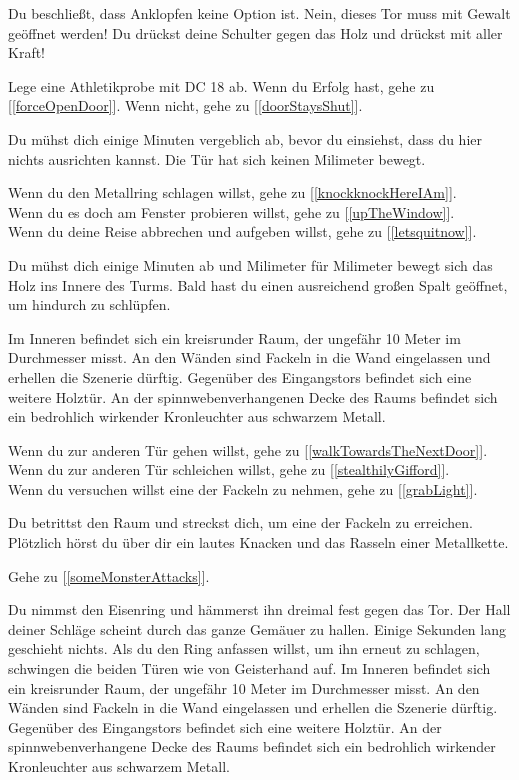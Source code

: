 
Du beschließt, dass Anklopfen keine Option ist. Nein, dieses Tor muss mit Gewalt geöffnet werden! Du drückst deine Schulter gegen das Holz und drückst mit aller Kraft!

Lege eine Athletikprobe mit DC 18 ab. Wenn du Erfolg hast, gehe zu [\ref{forceOpenDoor}].
Wenn nicht, gehe zu [\ref{doorStaysShut}].


Du mühst dich einige Minuten vergeblich ab, bevor du einsiehst, dass du hier nichts ausrichten kannst. Die Tür hat sich keinen Milimeter bewegt.

Wenn du den Metallring schlagen willst, gehe zu [\ref{knockknockHereIAm}].
\\Wenn du es doch am Fenster probieren willst, gehe zu [\ref{upTheWindow}].
\\Wenn du deine Reise abbrechen und aufgeben willst, gehe zu [\ref{letsquitnow}].


Du mühst dich einige Minuten ab und Milimeter für Milimeter bewegt sich das Holz ins Innere des Turms. Bald hast du einen ausreichend großen Spalt geöffnet, um hindurch zu schlüpfen.

Im Inneren befindet sich ein kreisrunder Raum, der ungefähr 10 Meter im Durchmesser misst. An den Wänden sind Fackeln in die Wand eingelassen und erhellen die Szenerie dürftig. Gegenüber des Eingangstors befindet sich eine weitere Holztür. An der spinnwebenverhangenen Decke des Raums befindet sich ein bedrohlich wirkender Kronleuchter aus schwarzem Metall.

Wenn du zur anderen Tür gehen willst, gehe zu [\ref{walkTowardsTheNextDoor}].
\\Wenn du zur anderen Tür schleichen willst, gehe zu [\ref{stealthilyGifford}].
\\Wenn du versuchen willst eine der Fackeln zu nehmen, gehe zu [\ref{grabLight}].


Du betrittst den Raum und streckst dich, um eine der Fackeln zu erreichen. Plötzlich hörst du über dir ein lautes Knacken und das Rasseln einer Metallkette.

Gehe zu [\ref{someMonsterAttacks}].


Du nimmst den Eisenring und hämmerst ihn dreimal fest gegen das Tor. Der Hall deiner Schläge scheint durch das ganze Gemäuer zu hallen. Einige Sekunden lang geschieht nichts. Als du den Ring anfassen willst, um ihn erneut zu schlagen, schwingen die beiden Türen wie von Geisterhand auf. Im Inneren befindet sich ein kreisrunder Raum, der ungefähr 10 Meter im Durchmesser misst. An den Wänden sind Fackeln in die Wand eingelassen und erhellen die Szenerie dürftig. Gegenüber des Eingangstors befindet sich eine weitere Holztür. An der spinnwebenverhangene Decke des Raums befindet sich ein bedrohlich wirkender Kronleuchter aus schwarzem Metall.

